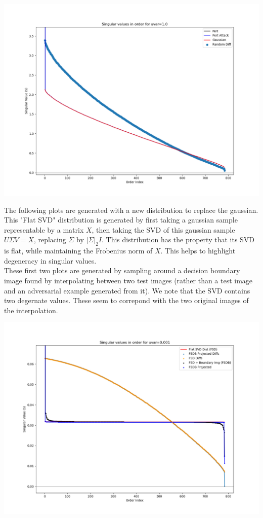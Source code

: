 \includegraphics[width=14cm]{c4_figures/SVD-rand_diff-decision_boundary_uvar-1.0-index-0-image-999.png}

The following plots are generated with a new distribution to replace the gaussian. This "Flat SVD" distribution is generated by first taking a gaussian sample representable by a matrix $X$, then taking the SVD of this gaussian sample $U \Sigma V = X$, replacing $\Sigma$ by $|\Sigma|_2 I$. This distribution has the property that its SVD is flat, while maintaining the Frobenius norm of $X$. This helps to highlight degeneracy in singular values. \\

These first two plots are generated by sampling around a decision boundary image found by interpolating between two test images (rather than a test image and an adversarial example generated from it). We note that the SVD contains two degernate values. These seem to correpond with the two original images of the interpolation. 

\includegraphics[width=14cm]{c4_figures/e05-SVD-uniform-rand_diff-decision_boundary_uvar-0.001-index-0-image-999.png}

